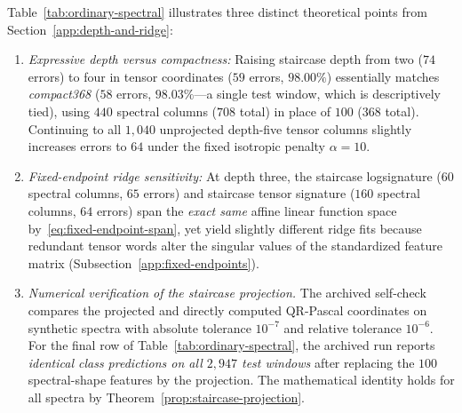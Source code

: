 Table~\ref{tab:ordinary-spectral} illustrates three distinct theoretical points
from Section~\ref{app:depth-and-ridge}:
\begin{enumerate}
\item \emph{Expressive depth versus compactness:} Raising staircase depth from
two (\(74\) errors) to four in tensor coordinates (\(59\) errors, \(98.00\%\))
essentially matches \emph{compact368} (\(58\) errors, \(98.03\%\)---a single
test window, which is descriptively tied), using \(440\) spectral columns
(\(708\) total) in place of \(100\) (\(368\) total). Continuing to all \(1{,}040\)
unprojected depth-five tensor columns slightly increases errors to \(64\) under
the fixed isotropic penalty \(\alpha = 10\).
\item \emph{Fixed-endpoint ridge sensitivity:} At depth three, the staircase
logsignature (\(60\) spectral columns, \(65\) errors) and staircase tensor
signature (\(160\) spectral columns, \(64\) errors) span the \emph{exact same}
affine linear function space by~\eqref{eq:fixed-endpoint-span}, yet yield
slightly different ridge fits because redundant tensor words alter the singular
values of the standardized feature matrix (Subsection~\ref{app:fixed-endpoints}).
\item \emph{Numerical verification of the staircase projection.} The archived
self-check compares the projected and directly computed QR-Pascal coordinates
on synthetic spectra with absolute tolerance \(10^{-7}\) and relative tolerance
\(10^{-6}\). For the final row of Table~\ref{tab:ordinary-spectral}, the archived
run reports \emph{identical class predictions on all \(2{,}947\) test windows}
after replacing the \(100\) spectral-shape features by the projection. The
mathematical identity holds for all spectra by Theorem~\ref{prop:staircase-projection}.
\end{enumerate}
\FloatBarrier
